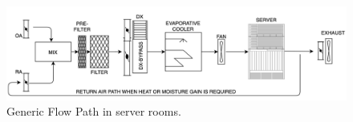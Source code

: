 \begin{figure} [!h]
\centering
\includegraphics[scale=.5]{methodology/images/airflow.png}
\caption[Airflow through DCS]{Generic Flow Path in server rooms.}
\label{img_airflow}
\end{figure}